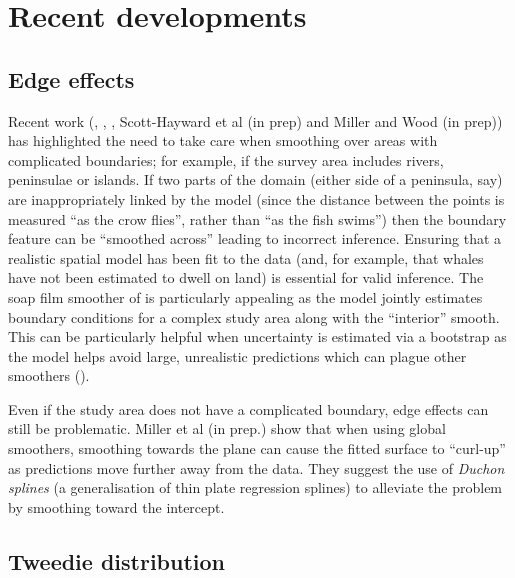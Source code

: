 \documentclass[a4paper,12pt]{article}
\begin{document}
\section*{Recent developments}
\label{s:recentadvances}

\subsection*{Edge effects}
\label{s:leakage}

Recent work (\cite{Ramsay:2002uo}, \cite{Wang:2007tf}, \cite{Wood:2008vo}, Scott-Hayward et al (in prep) and Miller and Wood (in prep)) has highlighted the need to take care when smoothing over areas with complicated boundaries; for example, if the survey area includes rivers, peninsulae or islands. If two parts of the domain (either side of a peninsula, say) are inappropriately linked by the model (since the distance between the points is measured ``as the crow flies'', rather than ``as the fish swims'') then the boundary feature can be ``smoothed across'' leading to incorrect inference. Ensuring that a realistic spatial model has been fit to the data (and, for example, that whales have not been estimated to dwell on land) is essential for valid inference. The soap film smoother of \cite{Wood:2008vo} is particularly appealing as the model jointly estimates boundary conditions for a complex study area along with the ``interior'' smooth. This can be particularly helpful when uncertainty is estimated via a bootstrap as the model helps avoid large, unrealistic predictions which can plague other smoothers (\cite{Bravington:2009vo}).

Even if the study area does not have a complicated boundary, edge effects can still be problematic. Miller et al (in prep.) show that when using global smoothers, smoothing towards the plane can cause the fitted surface to ``curl-up'' as predictions move further away from the data. They suggest the use of \textit{Duchon splines} (a generalisation of thin plate regression splines) to alleviate the problem by smoothing toward the intercept.

\subsection*{Tweedie distribution}
\label{s:Tweedie}
\end{document}
